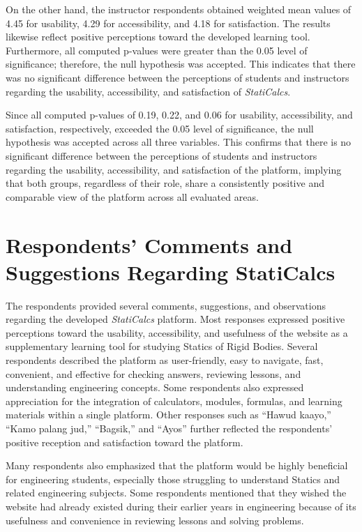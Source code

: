 On the other hand, the instructor respondents obtained weighted mean values of 4.45 for usability, 4.29 for accessibility, and 4.18 for satisfaction. The results likewise reflect positive perceptions toward the developed learning tool. Furthermore, all computed p-values were greater than the 0.05 level of significance; therefore, the null hypothesis was accepted. This indicates that there was no significant difference between the perceptions of students and instructors regarding the usability, accessibility, and satisfaction of \textit{StatiCalcs}.

Since all computed p-values of 0.19, 0.22, and 0.06 for usability, accessibility, and satisfaction, respectively, exceeded the 0.05 level of significance, the null hypothesis was accepted across all three variables. This confirms that there is no significant difference between the perceptions of students and instructors regarding the usability, accessibility, and satisfaction of the platform, implying that both groups, regardless of their role, share a consistently positive and comparable view of the platform across all evaluated areas.

\section{Respondents’ Comments and Suggestions Regarding StatiCalcs}

The respondents provided several comments, suggestions, and observations regarding the developed \textit{StatiCalcs} platform. Most responses expressed positive perceptions toward the usability, accessibility, and usefulness of the website as a supplementary learning tool for studying Statics of Rigid Bodies. Several respondents described the platform as user-friendly, easy to navigate, fast, convenient, and effective for checking answers, reviewing lessons, and understanding engineering concepts. Some respondents also expressed appreciation for the integration of calculators, modules, formulas, and learning materials within a single platform. Other responses such as ``Hawud kaayo,'' ``Kamo palang jud,'' ``Bagsik,'' and ``Ayos'' further reflected the respondents’ positive reception and satisfaction toward the platform.

Many respondents also emphasized that the platform would be highly beneficial for engineering students, especially those struggling to understand Statics and related engineering subjects. Some respondents mentioned that they wished the website had already existed during their earlier years in engineering because of its usefulness and convenience in reviewing lessons and solving problems.

